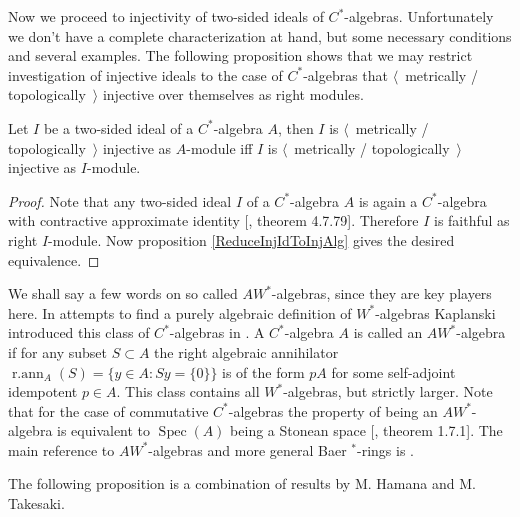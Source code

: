 Now we proceed to injectivity of two-sided ideals of $C^*$-algebras. Unfortunately we don't have a complete characterization at hand, but some necessary conditions and several examples. The following proposition shows that we may restrict investigation of injective ideals to the case of $C^*$-algebras that $\langle$~metrically / topologically~$\rangle$ injective over themselves as right modules.

\begin{proposition}\label{MetTopInjOvrAlgIffOvrItslf} Let $I$ be a two-sided ideal of a $C^*$-algebra $A$, then $I$ is $\langle$~metrically / topologically~$\rangle$ injective as $A$-module iff $I$ is $\langle$~metrically / topologically~$\rangle$ injective as $I$-module.
\end{proposition}
\begin{proof} Note that any two-sided ideal $I$ of a $C^*$-algebra $A$ is again a $C^*$-algebra with contractive approximate identity [\cite{HelBanLocConvAlg}, theorem 4.7.79]. Therefore $I$ is faithful as right $I$-module. Now proposition \ref{ReduceInjIdToInjAlg} gives the desired equivalence.
\end{proof}

We shall say a few words on so called $AW^*$-algebras, since they are key players here. In attempts to find a purely algebraic definition of $W^*$-algebras Kaplanski introduced this class of $C^*$-algebras in \cite{KaplProjInBanAlg}. A $C^*$-algebra $A$ is called an $AW^*$-algebra if for any subset $S\subset A$ the right algebraic annihilator $\operatorname{r.ann}_A(S)=\{y\in A: Sy=\{0\}\}$ is of the form $pA$ for some self-adjoint idempotent $p\in A$. This class contains all $W^*$-algebras, but strictly larger. Note that for the case of commutative $C^*$-algebras the property of being an $AW^*$-algebra is equivalent to  $\operatorname{Spec}(A)$ being a Stonean space [\cite{BerbBaerStarRings}, theorem 1.7.1]. The main reference to $AW^*$-algebras and more general Baer ${}^*$-rings is \cite{BerbBaerStarRings}. 

The following proposition is a combination of results by M. Hamana and M. Takesaki.


